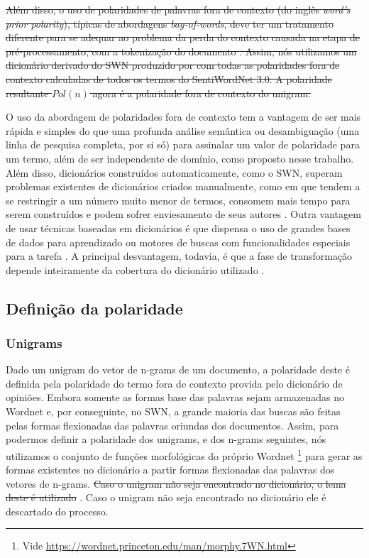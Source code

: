 \sout{Além disso, o uso de polaridades de palavras fora de contexto (do inglês \textit{word’s prior polarity}), típicas de abordagens \textit{bag-of-words}, deve ter um tratamento diferente para se adequar ao problema da perda do contexto causada na etapa de pré-processamento, com a tokenização do documento  \cite{guerini2013sentiment}. Assim, nós utilizamos um dicionário derivado do SWN produzido por  \cite{guerini2013sentiment} com todas as polaridades fora de contexto calculadas de todos os termos do SentiWordNet 3.0. A polaridade resultante $Pol(n)$ agora é a polaridade fora de contexto do unigram. }

O uso da abordagem de polaridades fora de contexto tem a vantagem de ser mais rápida e simples do que uma profunda análise semântica ou desambiguação (uma linha de pesquisa completa, por si só) para assinalar um valor de polaridade para um termo, além de ser independente de domínio, como proposto nesse trabalho. Além disso, dicionários construídos automaticamente, como o SWN, superam problemas existentes de dicionários criados manualmente, como em \cite{taboada2008extracting, taboada2011lexicon} que tendem a se restringir a um número muito menor de termos, consomem mais tempo para serem construídos e podem sofrer enviesamento de seus autores \cite{ohana2009sentiment}. Outra vantagem de usar técnicas baseadas em dicionários é que dispensa o uso de grandes bases de dados para aprendizado ou motores de buscas com funcionalidades especiais para a tarefa \cite{khan2011sentiment}. A principal desvantagem, todavia, é que a fase de  transformação depende inteiramente da cobertura do dicionário utilizado \cite{khan2011sentiment}. 

\subsection{Definição da polaridade}

\subsubsection{Unigrams}

Dado um unigram do vetor de n-grams de um documento, a polaridade deste é definida pela polaridade do termo fora de contexto provida pelo dicionário de opiniões. Embora somente as formas base das palavras sejam armazenadas no Wordnet e, por conseguinte, no SWN, a grande maioria das buscas são feitas pelas formas flexionadas das palavras oriundas dos documentos. Assim, para podermos definir a polaridade dos unigrams, e dos n-grams seguintes, nós utilizamos o conjunto de funções morfológicas do próprio Wordnet \footnote{Vide \url{https://wordnet.princeton.edu/man/morphy.7WN.html}} para gerar as formas existentes no dicionário a partir formas flexionadas das palavras dos vetores de n-grams. \sout{Caso o unigram não seja encontrado no dicionário, o lema deste é utilizado} . Caso o unigram não seja encontrado no dicionário ele é descartado do processo.

